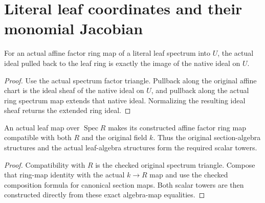 \section{Literal leaf coordinates and their monomial Jacobian}

\begin{lemma}\label{lem:sc0-leaf-chart-ideal-transport}
\leanok
{}
For an actual affine factor ring map of a literal leaf spectrum into $U$, the
actual ideal pulled back to the leaf ring is exactly the image of the native
ideal on $U$.
\end{lemma}
\begin{proof}
Use the actual spectrum factor triangle. Pullback along the original affine
chart is the ideal sheaf of the native ideal on $U$, and pullback along the
actual ring spectrum map extends that native ideal. Normalizing the resulting
ideal sheaf returns the extended ring ideal.
\end{proof}

\begin{lemma}\label{lem:sc0-leaf-chart-scalar-towers}
\leanok
{}
An actual leaf map over $\operatorname{Spec}R$ makes its constructed affine
factor ring map compatible with both $R$ and the original field $k$. Thus the
original section-algebra structures and the actual leaf-algebra structures
form the required scalar towers.
\end{lemma}
\begin{proof}
Compatibility with $R$ is the checked original spectrum triangle. Compose
that ring-map identity with the actual $k\to R$ map and use the checked
composition formula for canonical section maps. Both scalar towers are then
constructed directly from these exact algebra-map equalities.
\end{proof}

